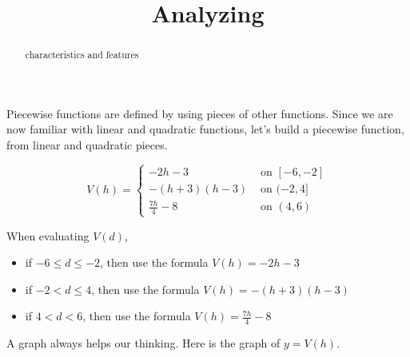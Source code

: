 \documentclass{ximera}
\title{Analyzing}
\begin{document}
\begin{abstract}
characteristics and features
\end{abstract}
\maketitle



Piecewise functions are defined by using pieces of other functions. Since we are now familiar with linear and quadratic functions, let's build a piecewise function, from linear and quadratic pieces. 




\[
V(h) = 
\begin{cases}
  -2h-3 & \text{ on } [-6, -2]   \\
  -(h+3)(h-3) & \text{ on } (-2, 4]  \\
  \frac{7h}{4} - 8 & \text{ on } (4,6)
\end{cases}
\]




\begin{idea}

When evaluating $V(d)$, 

\begin{itemize}
  \item if $-6 \leq d \leq -2$, then use the formula $V(h) = -2h - 3$
  \item if $-2 < d \leq 4$, then use the formula $V(h) = -(h+3)(h-3)$
  \item if $4 < d < 6$, then use the formula $V(h) = \frac{7h}{4} - 8$
\end{itemize}

\end{idea}

A graph always helps our thinking. Here is the graph of $y = V(h)$.
\end{document}
